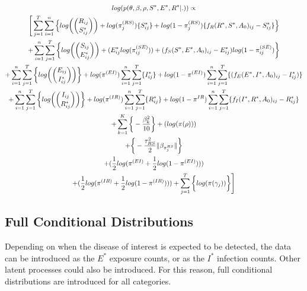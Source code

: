 \documentclass[12pt]{article}
\begin{document}
\begin{center}
\begin{multline}
\displaystyle
log(p(\theta,\beta,\rho,S^*,E^*,R^*|.)) \propto\\ \Bigg[ 
    \sum_{j=1}^T \sum_{i=1}^n\Big\{log\bigg(\dbinom{R_{ij}}{S^*_{ij}}\bigg) + log(\pi_j^{(RS)})\{S^*_{ij}\} + 
            log(1-\pi_j^{(RS)})\{f_R(R^*, S^*, A_0)_{ij} - S^*_{ij}\}\Big\} \\ 
            +\sum_{i=1}^n \sum_{j=1}^T\bigg\{
            log\bigg(\dbinom{S_{ij}}{E^*_{ij}}\bigg) + (E^*_{ij}log(\pi_{ij}^{(SE)})) + (f_S(S^*, E^*, A_0)_{ij} - E^*_{ij})log(1-\pi_{ij}^{(SE)})\bigg\} \\
            + \sum_{i=1}^n\sum_{j=1}^T\bigg\{ log\bigg(\dbinom{E_{ij}}{I^*_{ij}}\bigg)\bigg\} + log(\pi^{(EI)})\sum_{i=1}^n\sum_{j=1}^T\{I^*_{ij}\} 
            + log(1-\pi^{(EI)})\sum_{i=1}^n\sum_{j=1}^T\{(f_E(E^*, I^*, A_0)_{ij} - I^*_{ij})\}\\
            + \sum_{i=1}^n\sum_{j=1}^T\bigg\{ log\bigg(\dbinom{I_{ij}}{R^*_{ij}}\bigg)\bigg\} + log(\pi^{(IR)})\sum_{i=1}^n\sum_{j=1}^T\{R^*_{ij}\} + 
            log(1-\pi^{IR})\sum_{i=1}^n\sum_{j=1}^T\{ f_I(I^*, R^*, A_0)_{ij} - R^*_{ij}\}\\
            + \sum_{k = 1}^K\bigg\{-\frac{\beta^2_k}{10}\bigg\}
            + (log(\pi(\rho)))\\
            + \bigg\{ -\frac{\tau^2_{RS}}{2}\|\beta_{\pi_j^{RS}}\|  \bigg\} \\ 
            + (\frac{1}{2}log(\pi^{(EI)} + \frac{1}{2}log(1-\pi^{(EI)}))) \\
            + (\frac{1}{2}log(\pi^{(IR)} + \frac{1}{2}log(1-\pi^{(IR)})))   
            + \sum_{j=1}^{T} \bigg\{ log(\pi(\gamma_j)) \bigg\}\Bigg]\\
\end{multline}
\end{center}


\subsection{Full Conditional Distributions}
Depending on when the disease of interest is expected to be detected, the data can be 
introduced as the $E^*$ exposure counts, or as the $I^*$ infection counts. Other latent 
processes could also be introduced. For this reason, full conditional distributions are 
introduced for all categories. 
\end{document}
